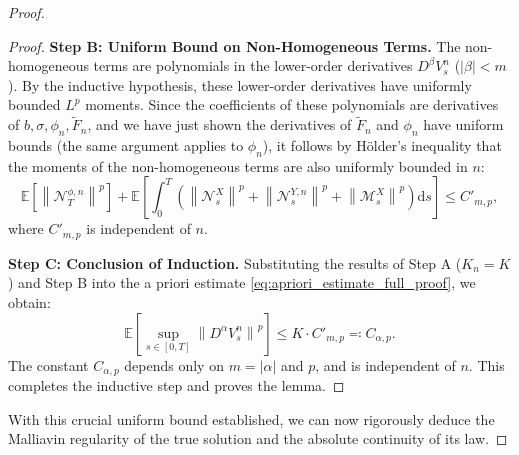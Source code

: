 \documentclass[12pt, letterpaper]{amsart}
\newcommand{\dd}{\mathrm{d}}
\newcommand{\norm}[1]{\left\lVert#1\right\rVert}
\theoremstyle{plain}
\theoremstyle{definition}
\theoremstyle{remark}
\numberwithin{equation}{section} %
\begin{document}
\begin{proof}
\begin{proof}
\vspace{1em}
\noindent\textbf{Step B: Uniform Bound on Non-Homogeneous Terms.}
The non-homogeneous terms are polynomials in the lower-order derivatives \(D^\beta V^n_s\) (\(|\beta| < m\)). By the inductive hypothesis, these lower-order derivatives have uniformly bounded \(L^p\) moments. Since the coefficients of these polynomials are derivatives of \(b, \sigma, \phi_n, \tilde{F}_n\), and we have just shown the derivatives of \(\tilde{F}_n\) and \(\phi_n\) have uniform bounds (the same argument applies to \(\phi_n\)), it follows by Hölder's inequality that the moments of the non-homogeneous terms are also uniformly bounded in \(n\):
\[ \mathbb{E}\left[\norm{\mathcal{N}^{\phi,n}_T}^p\right] + \mathbb{E}\left[\int_0^T (\norm{\mathcal{N}^X_s}^p + \norm{\mathcal{N}^{Y,n}_s}^p + \norm{\mathcal{M}^X_s}^p) \dd s\right] \le C'_{m,p}, \]
where \(C'_{m,p}\) is independent of \(n\).

\vspace{1em}
\noindent\textbf{Step C: Conclusion of Induction.}
Substituting the results of Step A (\(K_n = K\)) and Step B into the a priori estimate \eqref{eq:apriori_estimate_full_proof}, we obtain:
\[
\mathbb{E}\left[\sup_{s \in [0,T]} \norm{D^\alpha V^n_s}^p\right] \le K \cdot C'_{m,p} \eqqcolon C_{\alpha,p}.
\]
The constant \(C_{\alpha,p}\) depends only on \(m=|\alpha|\) and \(p\), and is independent of \(n\). This completes the inductive step and proves the lemma.
\end{proof}

With this crucial uniform bound established, we can now rigorously deduce the Malliavin regularity of the true solution and the absolute continuity of its law.


\end{proof}
\end{document}
